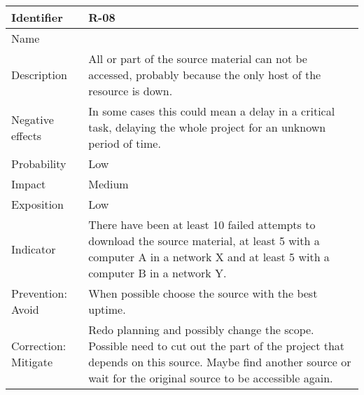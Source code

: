 \begin{table}[H]
	\begin{tabularx}{\textwidth}{|y|z|}
		\hline
		Identifier & \textbf{R-08} \\ \hline
		Name & \Rocho \\ \hline
		Description &
			All or part of the source material can not be accessed, probably because the only host of the resource is down.
		\\ \hline
		Negative effects &
			In some cases this could mean a delay in a critical task, delaying the whole project for an unknown period of time.
		\\ \hline
		Probability & Low\\ \hline
		Impact & Medium\\ \hline
		Exposition & Low\\ \hline
		Indicator & There have been at least 10 failed attempts to download the source material, at least 5 with a computer A in a network X and at least 5 with a computer B in a network Y.\\ \hline
		Prevention: Avoid &
			When possible choose the source with the best uptime.
		\\ \hline
		Correction: Mitigate &
			Redo planning and possibly change the scope. \linej
			Possible need to cut out the part of the project that depends on this source. \linej
			Maybe find another source or wait for the original source to be accessible again.
		\\ \hline
	\end{tabularx}
\end{table}

